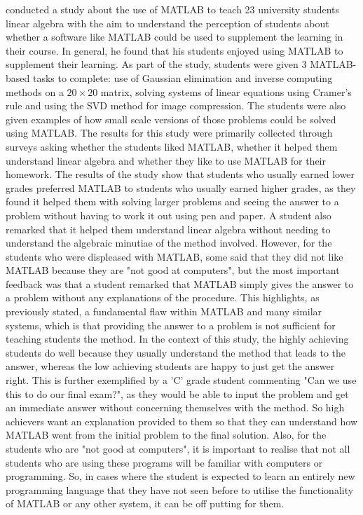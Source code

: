 \documentclass[
]{ceurart}
\begin{document}
\cite{matlab} conducted a study about the use of MATLAB to teach 23 university students linear algebra with the aim to understand the perception of students about whether a software like MATLAB could be used to supplement the learning in their course. In general, he found that his students enjoyed using MATLAB to supplement their learning. As part of the study, students were given 3 MATLAB-based tasks to complete: use of Gaussian elimination and inverse computing methods on a $20\times20$ matrix, solving systems of linear equations using Cramer's rule and using the SVD method for image compression. The students were also given examples of how small scale versions of those problems could be solved using MATLAB. The results for this study were primarily collected through surveys asking whether the students liked MATLAB, whether it helped them understand linear algebra and whether they like to use MATLAB for their homework. The results of the study show that students who usually earned lower grades preferred MATLAB to students who usually earned higher grades, as they found it helped them with solving larger problems and seeing the answer to a problem without having to work it out using pen and paper. A student also remarked that it helped them understand linear algebra without needing to understand the algebraic minutiae of the method involved. However, for the students who were displeased with MATLAB, some said that they did not like MATLAB because they are "not good at computers", but the most important feedback was that a student remarked that MATLAB simply gives the answer to a problem without any explanations of the procedure. This highlights, as previously stated, a fundamental flaw within MATLAB and many similar systems, which is that providing the answer to a problem is not sufficient for teaching students the method. In the context of this study, the highly achieving students do well because they usually understand the method that leads to the answer, whereas the low achieving students are happy to just get the answer right. This is further exemplified by a 'C' grade student commenting "Can we use this to do our final exam?", as they would be able to input the problem and get an immediate answer without concerning themselves with the method. So high achievers want an explanation provided to them so that they can understand how MATLAB went from the initial problem to the final solution. Also, for the students who are "not good at computers", it is important to realise that not all students who are using these programs will be familiar with computers or programming. So, in cases where the student is expected to learn an entirely new programming language that they have not seen before to utilise the functionality of MATLAB or any other system, it can be off putting for them.
\end{document}
